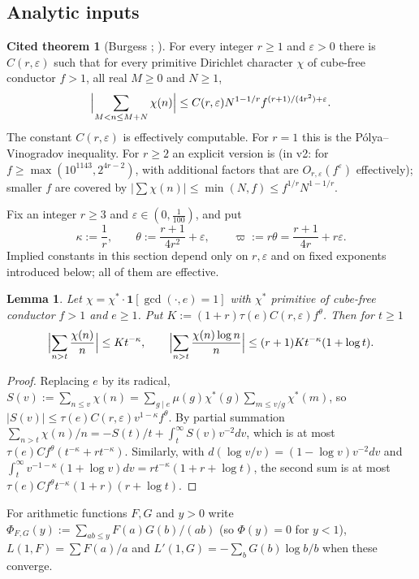 \documentclass[11pt,reqno]{amsart}
\newtheorem{lemma}[theorem]{Lemma}
\theoremstyle{definition}
\newtheorem{citedthm}[theorem]{Cited theorem}
\newcommand{\eps}{\varepsilon}
\begin{document}
\subsection{Analytic inputs}
\begin{citedthm}[Burgess \cite{Burgess62,Burgess63}; {\cite[Thm.~12.6]{IK}}]\label{cit:burgess}
For every integer $r\ge1$ and $\eps>0$ there is $C(r,\eps)$ such that for
every primitive Dirichlet character $\chi$ of cube-free conductor $f>1$,
all real $M\ge0$ and $N\ge1$,
\[
 \Bigl|\sum_{M<n\le M+N}\chi(n)\Bigr|\le C(r,\eps)N^{1-1/r}f^{(r+1)/(4r^2)+\eps}.
\]
The constant $C(r,\eps)$ is effectively computable.  For $r=1$ this is
the P\'olya--Vinogradov inequality.  For $r\ge2$ an explicit version is
\cite[Thm.~1.2]{HLMLT} (in v2: for $f\ge\max(10^{1143},2^{4r-2})$, with
additional factors that are $O_{r,\eps}(f^\eps)$ effectively); smaller $f$
are covered by $|\sum\chi(n)|\le\min(N,f)\le f^{1/r}N^{1-1/r}$.
\end{citedthm}

Fix an integer $r\ge3$ and $\eps\in(0,\frac1{100})$, and put
\[
 \kappa:=\frac1r,\qquad\theta:=\frac{r+1}{4r^2}+\eps,\qquad
 \varpi:=r\theta=\frac{r+1}{4r}+r\eps .
\]
Implied constants in this section depend only on $r,\eps$ and on fixed
exponents introduced below; all of them are effective.

\begin{lemma}\label{lem:tails}
Let $\chi=\chi^*\cdot\mathbf 1[\gcd(\cdot,e)=1]$ with $\chi^*$ primitive of
cube-free conductor $f>1$ and $e\ge1$.  Put
$K:=(1+r)\tau(e)C(r,\eps)f^\theta$.  Then for $t\ge1$
\[
 \Bigl|\sum_{n>t}\frac{\chi(n)}n\Bigr|\le Kt^{-\kappa},\qquad
 \Bigl|\sum_{n>t}\frac{\chi(n)\log n}n\Bigr|\le(r+1)Kt^{-\kappa}(1+\log t).
\]
\end{lemma}
\begin{proof}
Replacing $e$ by its radical, $S(v):=\sum_{n\le v}\chi(n)=\sum_{g\mid
e}\mu(g)\chi^*(g)\sum_{m\le v/g}\chi^*(m)$, so $|S(v)|\le\tau(e)C(r,\eps)
v^{1-\kappa}f^\theta$.  By partial summation
$\sum_{n>t}\chi(n)/n=-S(t)/t+\int_t^\infty S(v)v^{-2}dv$, which is at most
$\tau(e)Cf^\theta(t^{-\kappa}+rt^{-\kappa})$.  Similarly, with
$d(\log v/v)=(1-\log v)v^{-2}dv$ and
$\int_t^\infty v^{-1-\kappa}(1+\log v)dv=rt^{-\kappa}(1+r+\log t)$, the
second sum is at most $\tau(e)Cf^\theta t^{-\kappa}(1+r)(r+\log t)$.
\end{proof}

For arithmetic functions $F,G$ and $y>0$ write
$\Phi_{F,G}(y):=\sum_{ab\le y}F(a)G(b)/(ab)$ (so $\Phi(y)=0$ for $y<1$),
$L(1,F)=\sum F(a)/a$ and $L'(1,G)=-\sum_bG(b)\log b/b$ when these
converge.
\end{document}
